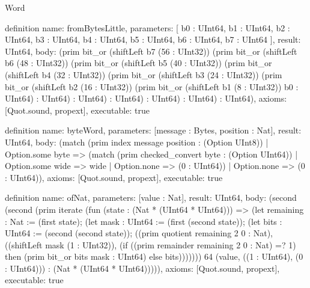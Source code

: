 \begin{lexlean}{Word}
\begin{semanticmodule}
definition{
  name: fromBytesLittle,
  parameters: [
    b0 : UInt64,
    b1 : UInt64,
    b2 : UInt64,
    b3 : UInt64,
    b4 : UInt64,
    b5 : UInt64,
    b6 : UInt64,
    b7 : UInt64
  ],
  result: UInt64,
  body: (prim bit_or (shiftLeft b7 (56 : UInt32)) (prim bit_or (shiftLeft b6 (48 : UInt32)) (prim bit_or (shiftLeft b5 (40 : UInt32)) (prim bit_or (shiftLeft b4 (32 : UInt32)) (prim bit_or (shiftLeft b3 (24 : UInt32)) (prim bit_or (shiftLeft b2 (16 : UInt32)) (prim bit_or (shiftLeft b1 (8 : UInt32)) b0 : UInt64) : UInt64) : UInt64) : UInt64) : UInt64) : UInt64) : UInt64),
  axioms: [Quot.sound, propext],
  executable: true
}

definition{
  name: byteWord,
  parameters: [message : Bytes, position : Nat],
  result: UInt64,
  body: (match (prim index message position : (Option UInt8))
    | Option.some byte => (match (prim checked_convert byte : (Option UInt64))
      | Option.some wide => wide
      | Option.none => (0 : UInt64))
    | Option.none => (0 : UInt64)),
  axioms: [Quot.sound, propext],
  executable: true
}

definition{
  name: ofNat,
  parameters: [value : Nat],
  result: UInt64,
  body: (second (second (prim iterate (fun (state : (Nat * (UInt64 * UInt64))) => (let remaining : Nat := (first state); (let mask : UInt64 := (first (second state)); (let bits : UInt64 := (second (second state)); ((prim quotient remaining 2 0 : Nat), ((shiftLeft mask (1 : UInt32)), (if ((prim remainder remaining 2 0 : Nat) =? 1) then (prim bit_or bits mask : UInt64) else bits))))))) 64 (value, ((1 : UInt64), (0 : UInt64))) : (Nat * (UInt64 * UInt64))))),
  axioms: [Quot.sound, propext],
  executable: true
}
\end{semanticmodule}
\end{lexlean}
